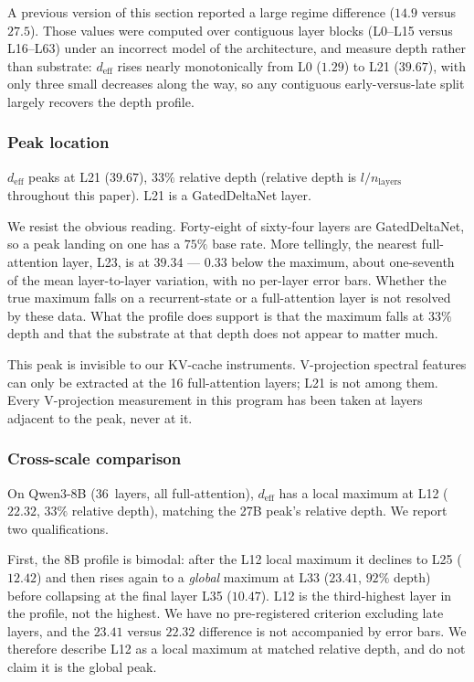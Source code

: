 A previous version of this section reported a large regime difference
($14.9$ versus $27.5$). Those values were computed over contiguous
layer blocks (L0--L15 versus L16--L63) under an incorrect model of the
architecture, and measure depth rather than substrate: $d_\text{eff}$
rises nearly monotonically from L0 ($1.29$) to L21 ($39.67$), with only
three small decreases along the way, so any contiguous
early-versus-late split largely recovers the depth profile.

\subsubsection{Peak location}

$d_\text{eff}$ peaks at L21 ($39.67$), $33\%$ relative depth
(relative depth is $l/n_\text{layers}$ throughout this paper).
L21 is a GatedDeltaNet layer.

We resist the obvious reading. Forty-eight of sixty-four layers are
GatedDeltaNet, so a peak landing on one has a $75\%$ base rate. More
tellingly, the nearest full-attention layer, L23, is at $39.34$ ---
$0.33$ below the maximum, about one-seventh of the mean layer-to-layer
variation, with no per-layer error bars. Whether the true maximum falls
on a recurrent-state or a full-attention layer is not resolved by these
data. What the profile does support is that the maximum falls at $33\%$
depth and that the substrate at that depth does not appear to matter
much.

This peak is invisible to our KV-cache instruments. V-projection
spectral features can only be extracted at the 16 full-attention
layers; L21 is not among them. Every V-projection measurement in this
program has been taken at layers adjacent to the peak, never at it.

\subsubsection{Cross-scale comparison}

On Qwen3-8B (36~layers, all full-attention), $d_\text{eff}$ has a
local maximum at L12 ($22.32$, $33\%$ relative depth), matching the
27B peak's relative depth. We report two qualifications.

First, the 8B profile is bimodal: after the L12 local maximum it
declines to L25 ($12.42$) and then rises again to a \emph{global}
maximum at L33 ($23.41$, $92\%$ depth) before collapsing at the final
layer L35 ($10.47$). L12 is the third-highest layer in the profile,
not the highest. We have no pre-registered criterion excluding late
layers, and the $23.41$ versus $22.32$ difference is not accompanied
by error bars. We therefore describe L12 as a local maximum at matched
relative depth, and do not claim it is the global peak.

